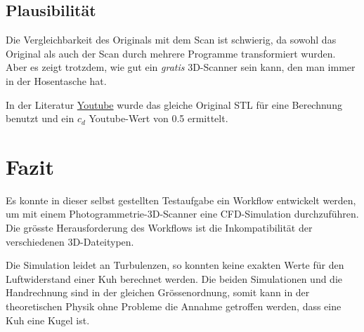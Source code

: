 \documentclass[a4paper,12pt]{article}
\begin{document}
\subsection{Plausibilität}
Die Vergleichbarkeit des Originals mit dem Scan ist schwierig, da sowohl das Original als auch der Scan durch mehrere Programme transformiert wurden. Aber es zeigt trotzdem, wie gut ein \textit{gratis} 3D-Scanner sein kann, den man immer in der Hosentasche hat.

In der Literatur \href{https://www.youtube.com/watch?v=FDG3rUx00yQ}{Youtube} wurde das gleiche Original STL für eine Berechnung benutzt und ein \( c_d \) Youtube-Wert von 0.5 ermittelt.

\section{Fazit}
Es konnte in dieser selbst gestellten Testaufgabe ein Workflow entwickelt werden, um mit einem Photogrammetrie-3D-Scanner eine CFD-Simulation durchzuführen. Die grösste Herausforderung des Workflows ist die Inkompatibilität der verschiedenen 3D-Dateitypen.

Die Simulation leidet an Turbulenzen, so konnten keine exakten Werte für den Luftwiderstand einer Kuh berechnet werden. Die beiden Simulationen und die Handrechnung sind in der gleichen Grössenordnung, somit kann in der theoretischen Physik ohne Probleme die Annahme getroffen werden, dass eine Kuh eine Kugel ist.
\end{document}
